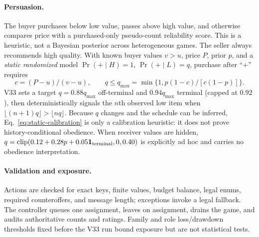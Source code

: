 \paragraph{Persuasion.}
The buyer purchases below low value, passes above high value, and otherwise
compares price with a purchased-only pseudo-count reliability score. This is a
heuristic, not a Bayesian posterior across heterogeneous games. The seller always
recommends high quality. With known buyer values $v>u$, price $P$, prior $p$,
and a \emph{static randomized} model $\Pr(+\mid H)=1$,
$\Pr(+\mid L)=q$, purchase after ``+'' requires
\begin{equation}
 c=(P-u)/(v-u),\qquad
 q\le q_{\max}=\min\{1,p(1-c)/[c(1-p)]\}.
 \label{eq:static-calibration}
\end{equation}
V33 sets a target $q=0.88q_{\max}$ off-terminal and $0.94q_{\max}$ terminal
(capped at $0.92$), then deterministically signals the $n$th observed low item
when $\lfloor(n+1)q\rfloor>\lfloor nq\rfloor$. Because $q$ changes and the
schedule can be inferred, Eq.~\ref{eq:static-calibration} is only a calibration
heuristic: it does not prove history-conditional obedience. When receiver values
are hidden, $q=\operatorname{clip}(0.12+0.28p+0.05\mathbf{1}_{\rm terminal},0,0.40)$
is explicitly ad hoc and carries no obedience interpretation.

\paragraph{Validation and exposure.}
Actions are checked for exact keys, finite values, budget balance, legal enums,
required counteroffers, and message length; exceptions invoke a legal fallback.
The controller queues one assignment, leaves on assignment, drains the game,
and audits authoritative counts and ratings. Family and role loss/drawdown
thresholds fixed before the V33 run bound exposure but are not statistical tests.
